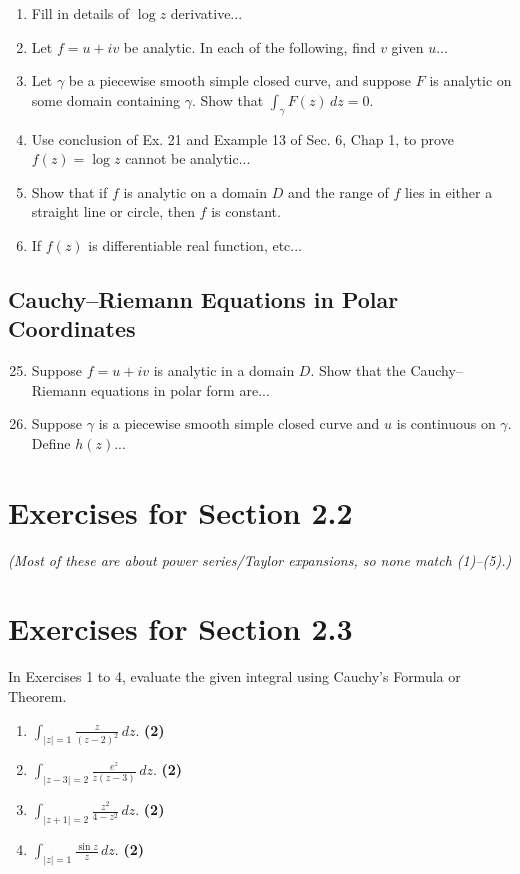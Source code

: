 \documentclass[12pt]{article}
\theoremstyle{definition} %
\theoremstyle{plain} %
\begin{document}
\begin{enumerate}
    \item Fill in details of $\log z$ derivative...
    \item Let $f = u + iv$ be analytic. In each of the following, find $v$ given $u$...
    \item Let $\gamma$ be a piecewise smooth simple closed curve, and suppose $F$ is analytic on some domain containing $\gamma$. Show that $\int_\gamma F(z)\,dz=0$.
    \item Use conclusion of Ex. 21 and Example 13 of Sec. 6, Chap 1, to prove $f(z)=\log z$ cannot be analytic...
    \item Show that if $f$ is analytic on a domain $D$ and the range of $f$ lies in either a straight line or circle, then $f$ is constant.
    \item If $f(z)$ is differentiable real function, etc...
\end{enumerate}

\subsection*{Cauchy–Riemann Equations in Polar Coordinates}
\begin{enumerate}
    \setcounter{enumi}{24}
    \item Suppose $f = u + iv$ is analytic in a domain $D$. Show that the Cauchy–Riemann equations in polar form are...
    \item Suppose $\gamma$ is a piecewise smooth simple closed curve and $u$ is continuous on $\gamma$. Define $h(z)$...
\end{enumerate}

\section*{Exercises for Section 2.2}

\noindent
\textit{(Most of these are about power series/Taylor expansions, so none match (1)--(5).)}

\section*{Exercises for Section 2.3}

In Exercises 1 to 4, evaluate the given integral using Cauchy’s Formula or Theorem.
\begin{enumerate}
    \item $\displaystyle \int_{|z|=1} \frac{z}{(z - 2)^2} \, dz$. \quad \textbf{(2)}
    \item $\displaystyle \int_{|z-3|=2} \frac{e^z}{z(z - 3)} \, dz$. \quad \textbf{(2)}
    \item $\displaystyle \int_{|z+1|=2} \frac{z^2}{4 - z^2} \, dz$. \quad \textbf{(2)}
    \item $\displaystyle \int_{|z|=1} \frac{\sin z}{z} \, dz$. \quad \textbf{(2)}
\end{enumerate}
\end{document}
